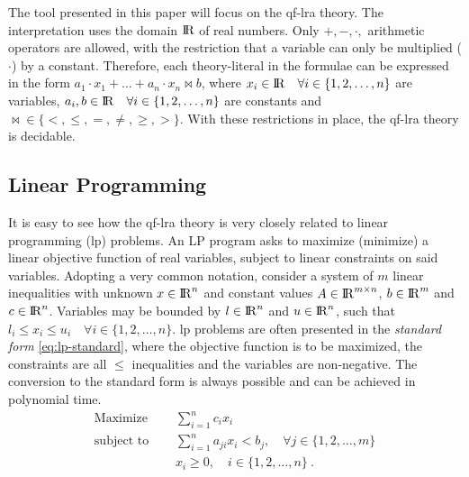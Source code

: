 \documentclass[runningheads]{llncs}
\begin{document}
The tool presented in this paper will focus on the \gls{qf-lra} theory.
The interpretation uses the domain ${\rm I\!R}$ of real numbers.
Only $+, -, \cdot,$ arithmetic operators are allowed, with the restriction that a variable can only be multiplied ($\cdot$) by a constant.
Therefore, each theory-literal in the formulae can be expressed in the form $a_1 \cdot x_1 + \ldots + a_n \cdot x_n \bowtie b$, where $x_i \in {\rm I\!R} \quad \forall i \in \{1, 2, \dots, n\}$ are variables, $a_i, b \in {\rm I\!R} \quad \forall i \in \{1, 2, \dots, n\}$ are constants and $\bowtie \in \{<, \le, =, \ne, \ge, >\}$.
With these restrictions in place, the \gls{qf-lra} theory is decidable.

\subsection{Linear Programming}
\label{sec:lp}

It is easy to see how the \gls{qf-lra} theory is very closely related to linear programming (\gls{lp}) problems.
An LP program asks to maximize (minimize) a linear objective function of real variables, subject to linear constraints on said variables.
Adopting a very common notation, consider a system of $m$ linear inequalities with unknown $x \in {\rm I\!R}^n$ and constant values $A \in {\rm I\!R}^{m \times n}$, $b \in {\rm I\!R}^m$ and $c \in {\rm I\!R}^n$.
Variables may be bounded by $l \in {\rm I\!R}^n$ and $u \in {\rm I\!R}^n$, such that $l_i \le x_i \le u_i \quad \forall i \in \{1, 2, \ldots, n\}$.
\gls{lp} problems are often presented in the \textit{standard form} \eqref{eq:lp-standard}, where the objective function is to be maximized, the constraints are all $\le$ inequalities and the variables are non-negative.
The conversion to the standard form is always possible and can be achieved in polynomial time.
\begin{equation}
    \label{eq:lp-standard}
    \begin{split}
        \text{Maximize }   \quad & \sum_{i=1}^{n} c_i x_i                      \\
        \text{subject to } \quad & \sum_{i=1}^{n} a_{ji}x_{i} < b_j,  \quad \forall j \in \{1, 2, \dots, m\} \\
        & x_i \ge 0,  \quad i \in \{1, 2, \ldots, n\}\ .
    \end{split}
\end{equation}
\end{document}
